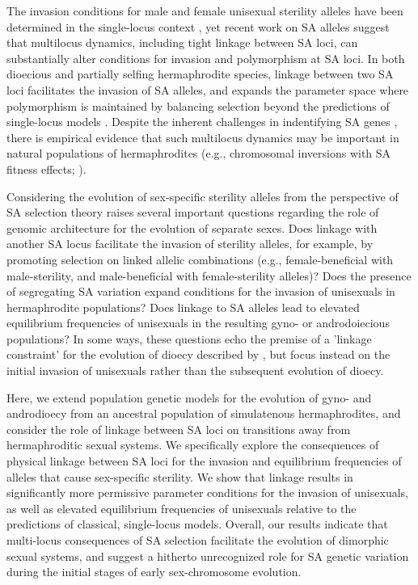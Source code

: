 \documentclass[9pt,twocolumn,twoside,lineno]{gsajnl}
\begin{document}
The invasion conditions for male and female unisexual sterility alleles have been determined in the single-locus context \citep{Charlesworth1978a}, yet recent work on SA alleles suggest that multilocus dynamics, including tight linkage between SA loci, can substantially alter conditions for invasion and polymorphism at SA loci. In both dioecious and partially selfing hermaphrodite species, linkage between two SA loci facilitates the invasion of SA alleles, and expands the parameter space where polymorphism is maintained by balancing selection beyond the predictions of single-locus models \citep{Kidwell1977,Patten2010,UbedaPatten2010,Olito2016}. Despite the inherent challenges in indentifying SA genes \citep{ConnallonClark2012,Barson2015}, there is empirical evidence that such multilocus dynamics may be important in natural populations of hermaphrodites (e.g., chromosomal inversions with SA fitness effects; \citealt{LeeKelly2015}).

Considering the evolution of sex-specific sterility alleles from the perspective of SA selection theory raises several important questions regarding the role of genomic architecture for the evolution of separate sexes. Does linkage with another SA locus facilitate the invasion of sterility alleles, for example, by promoting selection on linked allelic combinations (e.g., female-beneficial with male-sterility, and male-beneficial with female-sterility alleles)? Does the presence of segregating SA variation expand conditions for the invasion of unisexuals in hermaphrodite populations? Does linkage to SA alleles lead to elevated equilibrium frequencies of unisexuals in the resulting gyno- or androdoiecious populations? In some ways, these questions echo the premise of a 'linkage constraint' for the evolution of dioecy described by \citet{Charlesworth1978a}, but focus instead on the initial invasion of unisexuals rather than the subsequent evolution of dioecy. 

Here, we extend population genetic models for the evolution of gyno- and androdioecy from an ancestral population of simulatenous hermaphrodites, and consider the role of linkage between SA loci on transitions away from hermaphroditic sexual systems. We specifically explore the consequences of physical linkage between SA loci for the invasion and equilibrium frequencies of alleles that cause sex-specific sterility. We show that linkage results in significantly more permissive parameter conditions for the invasion of unisexuals, as well as elevated equilibrium frequencies of unisexuals relative to the predictions of classical, single-locus models. Overall, our results indicate that multi-locus consequences of SA selection facilitate the evolution of dimorphic sexual systems, and suggest a hitherto unrecognized role for SA genetic variation during the initial stages of early sex-chromosome evolution.
\end{document}
